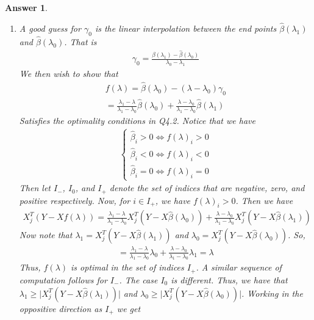 \documentclass[12pt]{article}
\theoremstyle{colon}
\newtheorem*{answer}{Answer}
\begin{document}
\begin{answer}
\begin{enumerate}[label=\arabic*)]
    \item A good guess for $\gamma_0$ is the linear interpolation between the end points $\widehat{\beta}(\lambda_1)$ and $\widehat{\beta}(\lambda_0)$. That is
      \begin{gather*}
        \gamma_0 = \frac{\widehat{\beta}(\lambda_1) - \widehat{\beta}(\lambda_0)}{\lambda_0 - \lambda_1}
      \end{gather*}
      We then wish to show that
      \begin{gather*}
        f(\lambda) = \widehat{\beta}(\lambda_0) - (\lambda - \lambda_0) \gamma_0 \\
        = \frac{\lambda_1 - \lambda}{\lambda_1 - \lambda_0} \widehat{\beta}(\lambda_0) + \frac{\lambda - \lambda_0}{\lambda_1 - \lambda_0} \widehat{\beta}(\lambda_1)
      \end{gather*}
      Satisfies the optimality conditions in Q4.2. Notice that we have
      \begin{gather*}
        \begin{cases}
          \widehat{\beta}_i > 0 \Leftrightarrow f(\lambda)_i > 0 \\
          \widehat{\beta}_i < 0 \Leftrightarrow f(\lambda)_i < 0 \\
          \widehat{\beta}_i = 0 \Leftrightarrow f(\lambda)_i = 0
        \end{cases}
      \end{gather*}
      Then let $I_-$, $I_0$, and $I_+$ denote the set of indices that are negative, zero, and positive respectively. Now, for $i \in I_+$, we have $f(\lambda)_i > 0$. Then we have
      \begin{gather*}
        X_j^T (Y - X f(\lambda)) = \frac{\lambda_1 - \lambda}{\lambda_1 - \lambda_0} X_j^T (Y - X \widehat{\beta}(\lambda_0)) + \frac{\lambda - \lambda_0}{\lambda_1 - \lambda_0} X_j^T (Y - X \widehat{\beta}(\lambda_1))
      \end{gather*}
      Now note that $\lambda_1 = X_j^T (Y - X \widehat{\beta}(\lambda_1))$ and $\lambda_0 = X_j^T (Y - X \widehat{\beta}(\lambda_0))$. So,
      \begin{gather*}
        = \frac{\lambda_1 - \lambda}{\lambda_1 - \lambda_0} \lambda_0 + \frac{\lambda - \lambda_0}{\lambda_1 - \lambda_0} \lambda_1 = \lambda
      \end{gather*}
      Thus, $f(\lambda)$ is optimal in the set of indices $I_+$. A similar sequence of computation follows for $I_-$. The case $I_0$ is different. Thus, we have that $\lambda_1 \geq \lvert X_j^T (Y-X \widehat{\beta}(\lambda_1)) \rvert$ and $\lambda_0 \geq \lvert X_j^T (Y-X \widehat{\beta}(\lambda_0)) \rvert$. Working in the oppositive direction as $I_+$ we get

\end{enumerate}
\end{answer}
\end{document}
